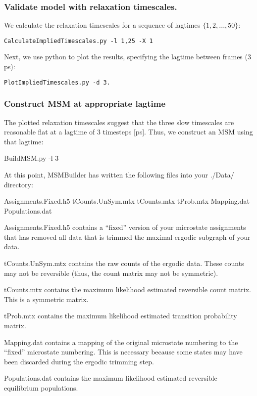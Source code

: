 \documentclass[12pt]{article}
\begin{document}
\subsubsection{Validate model with relaxation timescales.}
We calculate the relaxation timescales for a sequence of lagtimes $\{1, 2, ..., 50\}$:
\begin{verbatim}
CalculateImpliedTimescales.py -l 1,25 -X 1
\end{verbatim}

Next, we use python to plot the results, specifying the lagtime between frames (3 ps):  

\begin{verbatim}
PlotImpliedTimescales.py -d 3. 
\end{verbatim}

\subsubsection{Construct MSM at appropriate lagtime}
The plotted relaxation timescales suggest that the three slow timescales are reasonable flat at a lagtime of 3 timesteps [ps].  Thus, we construct an MSM using that lagtime:

BuildMSM.py -l 3

At this point, MSMBuilder has written the following files into your ./Data/ directory:

Assignments.Fixed.h5
tCounts.UnSym.mtx
tCounts.mtx
tProb.mtx
Mapping.dat
Populations.dat

Assignments.Fixed.h5 contains a “fixed” version of your microstate assignments that has removed all data that is trimmed the maximal ergodic subgraph of your data.  

tCounts.UnSym.mtx contains the raw counts of the ergodic data.  These counts may not be reversible (thus, the count matrix may not be symmetric).  

tCounts.mtx contains the maximum likelihood estimated reversible count matrix.  This is a symmetric matrix.  

tProb.mtx contains the maximum likelihood estimated transition probability matrix.  

Mapping.dat contains a mapping of the original microstate numbering to the “fixed” microstate numbering.  This is necessary because some states may have been discarded during the ergodic trimming step.  

Populations.dat contains the maximum likelihood estimated reversible equilibrium populations.  
\end{document}

